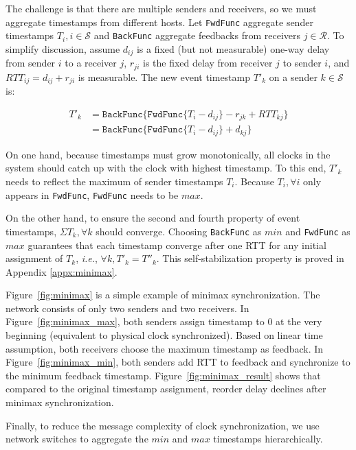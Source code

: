 The challenge is that there are multiple senders and receivers, so we must aggregate timestamps from different hosts.
Let \texttt{FwdFunc} aggregate sender timestamps $T_i, i \in \mathcal{S}$ and \texttt{BackFunc} aggregate feedbacks from receivers $j \in \mathcal{R}$.
To simplify discussion, assume $d_{ij}$ is a fixed (but not measurable) one-way delay from sender $i$ to a receiver $j$, $r_{ji}$ is the fixed delay from receiver $j$ to sender $i$, and $RTT_{ij} = d_{ij} + r_{ji}$ is measurable.
The new event timestamp $T'_k$ on a sender $k \in \mathcal{S}$ is:

\begin{equation*}
\begin{aligned}
T'_k & = \texttt{BackFunc} \{ \texttt{FwdFunc} \{ T_i - d_{ij} \} - r_{jk} + RTT_{kj} \} \\
     & = \texttt{BackFunc} \{ \texttt{FwdFunc} \{ T_i - d_{ij} \} + d_{kj} \}
\end{aligned}
\end{equation*}

On one hand, because timestamps must grow monotonically, all clocks in the system should catch up with the clock with highest timestamp.
To this end, $T'_k$ needs to reflect the maximum of sender timestamps $T_i$.
Because $T_i, \forall i$ only appears in \texttt{FwdFunc}, \texttt{FwdFunc} needs to be $max$.

On the other hand, to ensure the second and fourth property of event timestamps, $\Sigma T_k, \forall k$ should converge.
Choosing \texttt{BackFunc} as $min$ and \texttt{FwdFunc} as $max$ guarantees that each timestamp converge after one RTT for any initial assignment of $T_k$, \textit{i.e.}, $\forall k, T'_k = T''_k$.
This self-stabilization property is proved in Appendix \ref{appx:minimax}.

Figure~\ref{fig:minimax} is a simple example of minimax synchronization.
The network consists of only two senders and two receivers.
In Figure~\ref{fig:minimax_max}, both senders assign timestamp to $0$ at the very beginning (equivalent to physical clock synchronized).
Based on linear time assumption, both receivers choose the maximum timestamp as feedback.
In Figure~\ref{fig:minimax_min}, both senders add RTT to feedback and synchronize to the minimum feedback timestamp.
Figure~\ref{fig:minimax_result} shows that compared to the original timestamp assignment, reorder delay declines after minimax synchronization.

Finally, to reduce the message complexity of clock synchronization, we use network switches to aggregate the $min$ and $max$ timestamps hierarchically.
\fi

